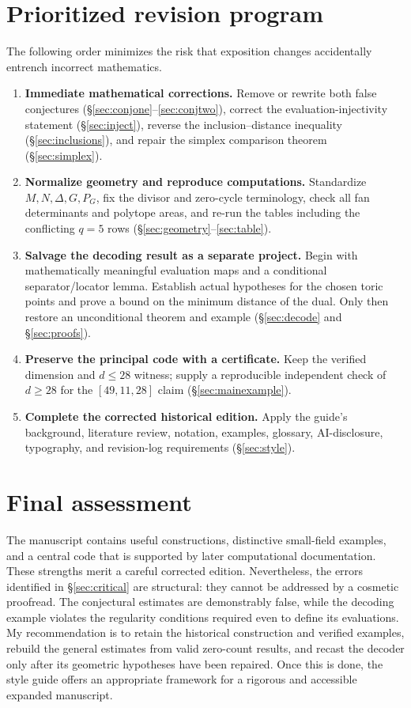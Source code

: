 \documentclass[12pt,letterpaper]{article}
\begin{document}
\section{Prioritized revision program}\label{sec:actions}
The following order minimizes the risk that exposition changes accidentally entrench incorrect mathematics.
\begin{enumerate}[label=\textbf{R\arabic*.},leftmargin=*]
\item \textbf{Immediate mathematical corrections.}  Remove or rewrite both false conjectures (\S\ref{sec:conjone}--\ref{sec:conjtwo}), correct the evaluation-injectivity statement (\S\ref{sec:inject}), reverse the inclusion--distance inequality (\S\ref{sec:inclusions}), and repair the simplex comparison theorem (\S\ref{sec:simplex}).
\item \textbf{Normalize geometry and reproduce computations.}  Standardize $M,N,\Delta,G,P_G$, fix the divisor and zero-cycle terminology, check all fan determinants and polytope areas, and re-run the tables including the conflicting $q=5$ rows (\S\ref{sec:geometry}--\ref{sec:table}).
\item \textbf{Salvage the decoding result as a separate project.}  Begin with mathematically meaningful evaluation maps and a conditional separator/locator lemma.  Establish actual hypotheses for the chosen toric points and prove a bound on the minimum distance of the dual.  Only then restore an unconditional theorem and example (\S\ref{sec:decode} and \S\ref{sec:proofs}).
\item \textbf{Preserve the principal code with a certificate.}  Keep the verified dimension and $d\le28$ witness; supply a reproducible independent check of $d\ge28$ for the $[49,11,28]$ claim (\S\ref{sec:mainexample}).
\item \textbf{Complete the corrected historical edition.}  Apply the guide's background, literature review, notation, examples, glossary, AI-disclosure, typography, and revision-log requirements (\S\ref{sec:style}).
\end{enumerate}

\section{Final assessment}\label{sec:conclusion}
The manuscript contains useful constructions, distinctive small-field examples, and a central code that is supported by later computational documentation.  These strengths merit a careful corrected edition.  Nevertheless, the errors identified in \S\ref{sec:critical} are structural: they cannot be addressed by a cosmetic proofread.  The conjectural estimates are demonstrably false, while the decoding example violates the regularity conditions required even to define its evaluations.  My recommendation is to retain the historical construction and verified examples, rebuild the general estimates from valid zero-count results, and recast the decoder only after its geometric hypotheses have been repaired.  Once this is done, the style guide offers an appropriate framework for a rigorous and accessible expanded manuscript.
\end{document}
